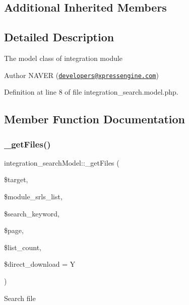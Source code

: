 \subsection*{Additional Inherited Members}


\subsection{Detailed Description}
The model class of integration module

\begin{DoxyAuthor}{Author}
N\+A\+V\+ER (\href{mailto:developers@xpressengine.com}{\tt developers@xpressengine.\+com}) 
\end{DoxyAuthor}


Definition at line 8 of file integration\+\_\+search.\+model.\+php.



\subsection{Member Function Documentation}
\mbox{\label{classintegration__searchModel_a88561e8ec8d5c401cee5220a0297d6e9}} 
\subsubsection{\texorpdfstring{\+\_\+get\+Files()}{\_getFiles()}}
{\footnotesize\ttfamily integration\+\_\+search\+Model\+::\+\_\+get\+Files (\begin{DoxyParamCaption}\item[{}]{\$target,  }\item[{}]{\$module\+\_\+srls\+\_\+list,  }\item[{}]{\$search\+\_\+keyword,  }\item[{}]{\$page,  }\item[{}]{\$list\+\_\+count,  }\item[{}]{\$direct\+\_\+download = {\ttfamily \textquotesingle{}Y\textquotesingle{}} }\end{DoxyParamCaption})}

Search file


